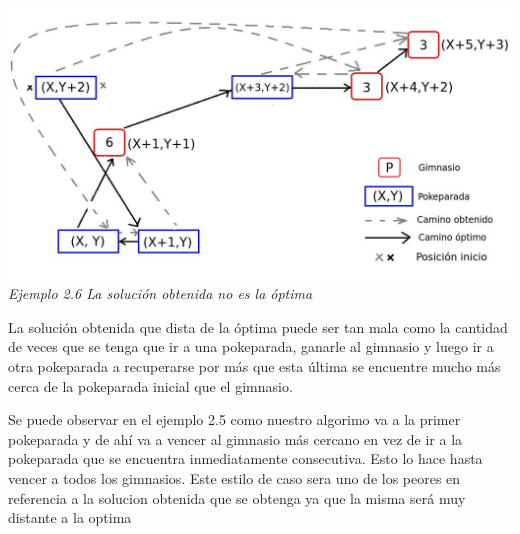   
\vspace*{0.3cm} \vspace*{0.3cm}
  \begin{center}
\includegraphics[scale=0.60]{./EJ2/nooptima2.jpeg}
\\{\textit{Ejemplo 2.6 La soluci\'on obtenida no es la \'optima}}
  \end{center}
  \vspace*{0.3cm}

La soluci\'on obtenida que dista de la \'optima puede ser tan mala como la cantidad de veces que se tenga que ir a una pokeparada, ganarle al gimnasio y luego ir a otra pokeparada a recuperarse por m\'as que esta \'ultima se encuentre mucho m\'as cerca de la pokeparada inicial que el gimnasio.

Se puede observar en el ejemplo 2.5 como nuestro algorimo va a la primer pokeparada y de ah\'i va a vencer al gimnasio m\'as cercano en vez de ir a la pokeparada que se encuentra inmediatamente consecutiva. Esto lo hace hasta vencer a todos los gimnasios.
Este estilo de caso sera uno de los peores en referencia a la solucion obtenida que se obtenga ya que la misma ser\'a muy distante a la optima
